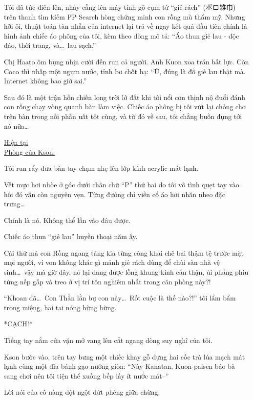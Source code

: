 \documentclass[../main.tex]{subfiles}
\begin{document}
Tôi đã tức điên lên, nhảy cẫng lên máy tính gõ cụm từ ``giẻ rách'' (ボロ雑巾) trên thanh tìm kiếm PP Search hòng chứng minh con rồng mù thẩm mỹ. Nhưng hỡi ôi, thuật toán tàn nhẫn của internet lại trả về ngay kết quả đầu tiên chính là hình ảnh chiếc áo phông của tôi, kèm theo dòng mô tả: ``Áo thun giẻ lau - độc đáo, thời trang, và\dots\ lau sạch.''

Chị Haato ôm bụng nhịn cười đến run cả người. Anh Kuon xoa trán bất lực. Còn Coco thì nhấp một ngụm nước, tỉnh bơ chốt hạ: ``Ừ, đúng là đồ giẻ lau thật mà. Internet không bao giờ sai.''

Sau đó là một trận hỗn chiến long trời lở đất khi tôi nổi cơn thịnh nộ đuổi đánh con rồng chạy vòng quanh bàn làm việc. Chiếc áo phông bị tôi vứt lại chỏng chơ trên bàn trong nỗi phẫn uất tột cùng, và từ đó về sau, tôi chẳng buồn đụng tới nó nữa\dots

\ct

\begin{center}
  \uline{Hiện tại\\Phòng của Kson.}
\end{center}

Tôi run rẩy đưa bàn tay chạm nhẹ lên lớp kính acrylic mát lạnh.

Vết mực hơi nhòe ở góc dưới chân chữ ``P'' thứ hai do tôi vô tình quẹt tay vào hồi đó vẫn còn nguyên vẹn. Từng đường chỉ viền cổ áo hơi nhăn nheo đặc trưng\dots\

Chính là nó. Không thể lẫn vào đâu được.

Chiếc áo thun ``giẻ lau'' huyền thoại năm ấy.

Cái thứ mà con Rồng ngang tàng kia từng công khai chê bai thậm tệ trước mặt mọi người, ví von không khác gì mảnh giẻ rách dùng để chùi sàn nhà vệ sinh\dots\ vậy mà giờ đây, nó lại đang được lồng khung kính cẩn thận, ủi phẳng phiu từng nếp gấp và treo ở vị trí tôn nghiêm nhất trong căn phòng này?!

``Khoan đã\dots\ Con Thằn lằn bự con này\dots\ Rốt cuộc là thế nào?!'' tôi lẩm bẩm trong miệng, hai tai nóng bừng bừng.

*CẠCH!*

Tiếng tay nắm cửa vặn mở vang lên cắt ngang dòng suy nghĩ của tôi.

Kson bước vào, trên tay bưng một chiếc khay gỗ đựng hai cốc trà lúa mạch mát lạnh cùng một đĩa bánh gạo nướng giòn: ``Này Kanatan, Kuon-paisen bảo bà sang chơi nên tôi tiện thể xuống bếp lấy ít nước mát--''

Lời nói của cô nàng đột ngột đứt phéng giữa chừng.
\end{document}
